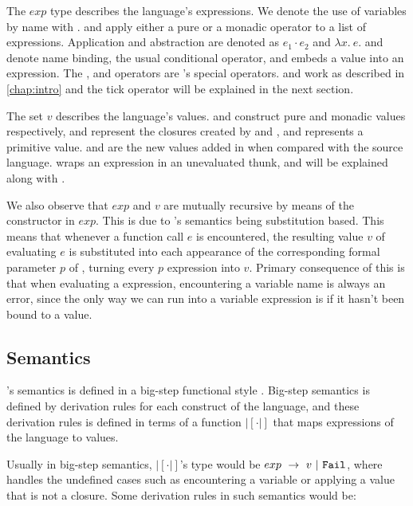 The $exp$ type describes the language's expressions. We denote the use of
variables by name with .  and  apply either a pure
or a monadic operator to a list of expressions. Application and abstraction are
denoted as $e_1 \cdot e_2$ and $\lambda x.\ e$.  and 
denote name binding,  the usual conditional operator, and
 embeds a value into an expression. The ,  and
 operators are \ThunkLang{}'s special operators.  and
 work as described in \autoref{chap:intro} and the tick operator will
be explained in the next section.

The set $v$ describes the language's values.  and 
construct pure and monadic values respectively,  and
 represent the closures created by  and ,
and  represents a primitive value.  and  are
the new values added in \ThunkLang{} when compared with the source language.
 wraps an expression in an unevaluated thunk, and  will
be explained along with .

We also observe that $exp$ and $v$ are mutually recursive by means of the
 constructor in $exp$. This is due to \ThunkLang{}'s semantics being
substitution based. This means that whenever a function call  $e$ is
encountered, the resulting value $v$ of evaluating $e$ is substituted into each
appearance of the corresponding formal parameter $p$ of , turning every
 $p$ expression into  $v$. Primary consequence of this is
that when evaluating a \ThunkLang{} expression, encountering a variable name is
always an error, since the only way we can run into a variable expression is if
it hasn't been bound to a value.

\subsection{Semantics}

\ThunkLang{}'s semantics is defined in a big-step functional style
\cite{kahn1987natural}. Big-step semantics is defined by derivation rules for
each construct of the language, and these derivation rules is defined in terms
of a function $|[\cdot|]$ that maps expressions of the language to values.

Usually in big-step semantics, $|[\cdot|]$'s type would be $exp\ \to\ v\ |\
$, where \lit{Fail} handles the undefined cases such as encountering a
variable or applying a value that is not a closure. Some derivation rules in
such semantics would be:


